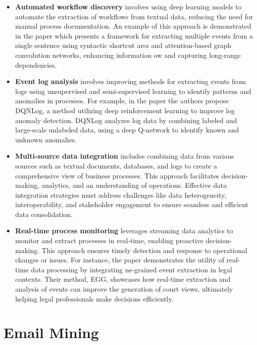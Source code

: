 \begin{itemize}
    \item \textbf{Automated workflow discovery} involves using deep learning models to automate the extraction of workflows from textual data, reducing the need for manual process documentation. An example of this approach is demonstrated in the paper\cite{liu2018jointly} which presents a framework for extracting multiple events from a single sentence using syntactic shortcut arcs and attention-based graph convolution networks, enhancing information ow and capturing long-range dependencies.

    \item \textbf{Event log analysis} involves improving methods for extracting events from logs using unsupervised and semi-supervised learning to identify patterns and anomalies in processes.
 For example, in the paper\cite{he2024semi} the authors propose DQNLog, a method utilizing deep reinforcement learning to improve log anomaly detection. DQNLog analyzes log data by combining labeled and large-scale unlabeled data, using a deep Q-network to identify known and unknown anomalies.

    \item  \textbf{Multi-source data integration} includes combining data from various sources such as textual documents, databases, and logs to create a comprehensive view of business processes. This approach facilitates decision-making, analytics, and an understanding of operations. Effective data integration strategies must address challenges like data heterogeneity, interoperability, and stakeholder engagement to ensure seamless and efficient data consolidation\cite{samuelsen2019integrating}.

    \item   \textbf{Real-time process monitoring} leverages streaming data analytics to monitor and extract processes in real-time, enabling proactive decision-making. This approach ensures timely detection and response to operational changes or issues. For instance, the paper\cite{yue2024event} demonstrates the utility of real-time data processing by integrating ne-grained event extraction in legal contexts. Their method, EGG, showcases how real-time extraction and analysis of events can improve the generation of court views, ultimately helping legal professionals make decisions efficiently.
\end{itemize}


\section{Email Mining}
\label{sec:email_mining}

